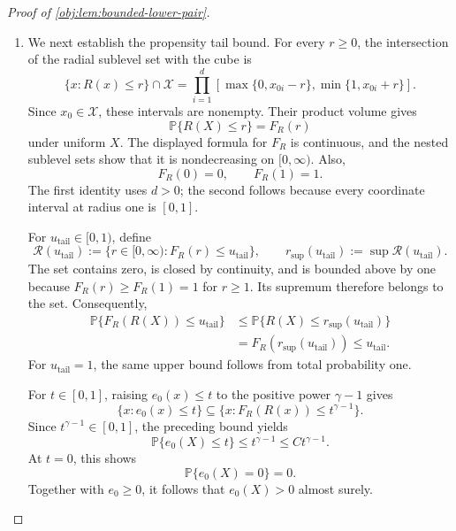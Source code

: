\begin{proof}[Proof of \cref{obj:lem:bounded-lower-pair}]
\begin{enumerate}
The treated potential-outcome marginal of the conditional product kernel
is \(B\operatorname{Bernoulli}(p_{j,h}(x))\). Thus, under the constructed
completion,
\[
\mathbb E_{\widetilde P_{j,h}}[Y(1)\mid X=x]
=(1-p_{j,h}(x))\,0+p_{j,h}(x)B
=\mu_{j,h}(x)
\]
for Lebesgue-almost every \(x\in\mathcal X\). This establishes the
response smoothness requirement in \cref{obj:ass:holder-response}.

\item We next establish the propensity tail bound. For every \(r\ge0\),
the intersection of the radial sublevel set with the cube is
\[
\{x:R(x)\le r\}\cap\mathcal X
=
\prod_{i=1}^{d}
\left[
\max\{0,x_{0i}-r\},
\min\{1,x_{0i}+r\}
\right].
\]
Since \(x_0\in\mathcal X\), these intervals are nonempty. Their product
volume gives
\[
\mathbb P\{R(X)\le r\}=F_R(r)
\]
under uniform \(X\). The displayed formula for \(F_R\) is continuous,
and the nested sublevel sets show that it is nondecreasing on
\([0,\infty)\). Also,
\[
F_R(0)=0,\qquad F_R(1)=1.
\]
The first identity uses \(d>0\); the second follows because every
coordinate interval at radius one is \([0,1]\).

For \(u_{\mathrm{tail}}\in[0,1)\), define
\[
\mathscr R(u_{\mathrm{tail}})
:=
\{r\in[0,\infty):F_R(r)\le u_{\mathrm{tail}}\},
\qquad
r_{\sup}(u_{\mathrm{tail}})
:=\sup\mathscr R(u_{\mathrm{tail}}).
\]
The set contains zero, is closed by continuity, and is bounded above
by one because \(F_R(r)\ge F_R(1)=1\) for \(r\ge1\). Its supremum
therefore belongs to the set. Consequently,
\[
\begin{aligned}
\mathbb P\{F_R(R(X))\le u_{\mathrm{tail}}\}
&\le \mathbb P\{R(X)\le r_{\sup}(u_{\mathrm{tail}})\}\\
&=F_R(r_{\sup}(u_{\mathrm{tail}}))
\le u_{\mathrm{tail}}.
\end{aligned}
\]
For \(u_{\mathrm{tail}}=1\), the same upper bound follows from total
probability one.

For \(t\in[0,1]\), raising \(e_0(x)\le t\) to the positive power
\(\gamma-1\) gives
\[
\{x:e_0(x)\le t\}
\subseteq
\{x:F_R(R(x))\le t^{\gamma-1}\}.
\]
Since \(t^{\gamma-1}\in[0,1]\), the preceding bound yields
\[
\mathbb P\{e_0(X)\le t\}
\le t^{\gamma-1}
\le Ct^{\gamma-1}.
\]
At \(t=0\), this shows
\[
\mathbb P\{e_0(X)=0\}=0.
\]
Together with \(e_0\ge0\), it follows that \(e_0(X)>0\) almost surely.


\end{enumerate}
\end{proof}
